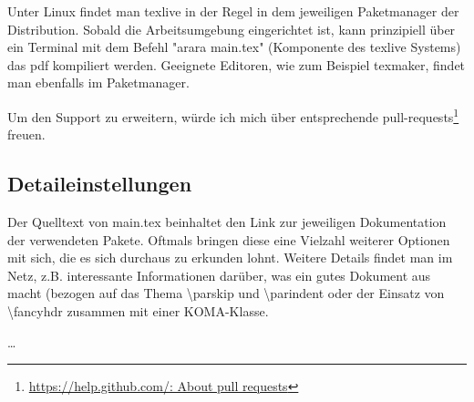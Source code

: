 Unter Linux findet man texlive in der Regel in dem jeweiligen Paketmanager der Distribution. Sobald die Arbeitsumgebung eingerichtet ist, kann prinzipiell über ein Terminal mit dem Befehl "arara main.tex" (Komponente des texlive Systems) das pdf kompiliert werden.
Geeignete Editoren, wie zum Beispiel texmaker, findet man ebenfalls im Paketmanager.

Um den Support zu erweitern, würde ich mich über entsprechende pull-requests\footnote{\href{https://help.github.com/en/articles/about-pull-requests}{https://help.github.com/: About pull requests}} freuen.

\subsection{Detaileinstellungen}
Der Quelltext von main.tex beinhaltet den Link zur jeweiligen Dokumentation der verwendeten Pakete. Oftmals bringen diese eine Vielzahl weiterer Optionen mit sich, die es sich durchaus zu erkunden lohnt.
Weitere Details findet man im Netz, z.B.  interessante Informationen darüber, was ein gutes Dokument aus macht (bezogen auf das Thema \textbackslash parskip und \textbackslash parindent oder der Einsatz von \textbackslash fancyhdr zusammen mit einer KOMA-Klasse.

\dots
